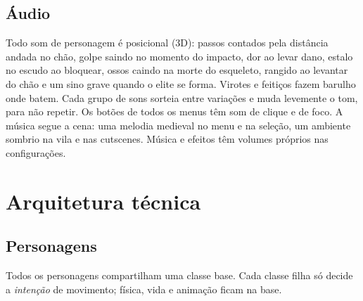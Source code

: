\documentclass[11pt,a4paper]{article}
\begin{document}
\subsection{Áudio}

Todo som de personagem é posicional (3D): passos contados pela distância andada no chão, golpe saindo no momento do impacto, dor ao levar dano, estalo no escudo ao bloquear, ossos caindo na morte do esqueleto, rangido ao levantar do chão e um sino grave quando o elite se forma. Virotes e feitiços fazem barulho onde batem. Cada grupo de sons sorteia entre variações e muda levemente o tom, para não repetir. Os botões de todos os menus têm som de clique e de foco. A música segue a cena: uma melodia medieval no menu e na seleção, um ambiente sombrio na vila e nas cutscenes. Música e efeitos têm volumes próprios nas configurações.

\section{Arquitetura técnica}

\subsection{Personagens}

Todos os personagens compartilham uma classe base. Cada classe filha só decide a \emph{intenção} de movimento; física, vida e animação ficam na base.

\begin{center}
\end{center}
\end{document}

